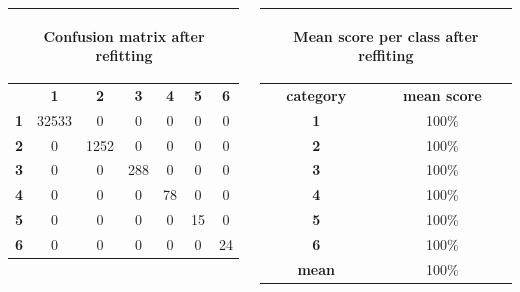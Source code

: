 \documentclass[c]{beamer}
\begin{document}
\begin{frame}
\begin{columns}
\begin{column}{0.7\textwidth}
  \begin{table}
  \begin{center}
  \begin{adjustbox}{max width=0.6\textwidth}
  {\tiny
  \begin{tabular}{|c|c|c|c|c|c|c|}
    \hline
    \multicolumn{7}{|c|}{{\tiny \begin{bf}Confusion matrix after refitting\end{bf}}} \\
    \hline
     & \textbf{1} & \textbf{2} & \textbf{3} & \textbf{4} & \textbf{5} & \textbf{6}\\
    \hline
    \textbf{1} & 32533 & 0 & 0 & 0 & 0 & 0\\
    \hline
    \textbf{2} & 0 & 1252 & 0 & 0 & 0 & 0\\
    \hline
    \textbf{3} & 0 & 0 & 288 & 0 & 0 & 0\\
    \hline
    \textbf{4} & 0 & 0 & 0 & 78 & 0 & 0\\
    \hline
    \textbf{5} & 0 & 0 & 0 & 0 & 15 & 0\\
    \hline
    \textbf{6} & 0 & 0 & 0 & 0 & 0 & 24\\
    \hline
  \end{tabular}
  }
  \end{adjustbox}
  \end{center}
  \end{table}
\end{column}
\begin{column}{0.5\textwidth}
   \begin{table}
    \begin{center}
    \begin{adjustbox}{max width=0.5\textwidth}
    {\tiny 
    \begin{tabular}{|c|c|}
      \hline
      \multicolumn{2}{|c|}{\begin{bf}Mean score per class after reffiting\end{bf}} \\
      \hline
      \textbf{category} & \textbf{mean score}\\
      \hline
      \textbf{1} & 100\% \\
      \hline
      \textbf{2} & 100\% \\
      \hline
      \textbf{3} & 100\% \\
      \hline
      \textbf{4} & 100\% \\
      \hline
      \textbf{5} & 100\% \\
      \hline
      \textbf{6} & 100\% \\
      \hline
      \textbf{mean} & 100\% \\
      \hline
    \end{tabular}
    }
    \end{adjustbox}
    \end{center}
  \end{table}
\end{column}

\end{columns}
\end{frame}
\end{document}

